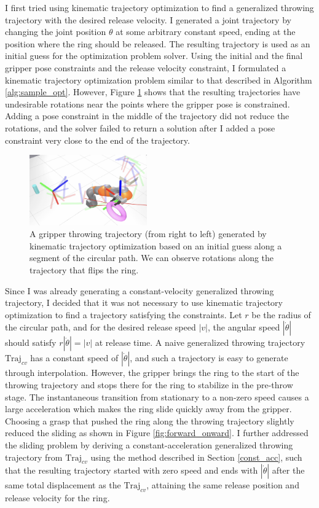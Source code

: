\documentclass[conference]{IEEEtran}
\begin{document}
I first tried using kinematic trajectory optimization to find a generalized throwing trajectory with the desired release velocity. I generated a joint trajectory by changing the joint position $\theta$ at some arbitrary constant speed, ending at the position where the ring should be released. The resulting trajectory is used as an initial guess for the optimization problem solver. Using the initial and the final gripper pose constraints and the release velocity constraint, I formulated a kinematic trajectory optimization problem similar to that described in Algorithm \ref{alg:sample_opt}. However, Figure \ref{fig:circle_rotation_traj} shows that the resulting trajectories have undesirable rotations near the points where the gripper pose is constrained. Adding a pose constraint in the middle of the trajectory did not reduce the rotations, and the solver failed to return a solution after I added a pose constraint very close to the end of the trajectory.

\begin{figure}[ht]
\centering
\includegraphics[width=0.45\textwidth]{images/circle_rotation_traj.png}
\caption{A gripper throwing trajectory (from right to left) generated by kinematic trajectory optimization based on an initial guess along a segment of the circular path. We can observe rotations along the trajectory that flips the ring.}
\label{fig:circle_rotation_traj}
\end{figure}

Since I was already generating a constant-velocity generalized throwing trajectory,  I decided that it was not necessary to use kinematic trajectory optimization to find a trajectory satisfying the constraints. Let $r$ be the radius of the circular path, and for the desired release speed $|v|$, the angular speed $| \dot{\theta} |$ should satisfy $r |\dot{\theta}| = |v|$ at release time. A naive generalized throwing trajectory $\text{Traj}_{cv}$ has a constant speed of $|\dot{\theta}|$, and such a trajectory is easy to generate through interpolation. However, the gripper brings the ring to the start of the throwing trajectory and stops there for the ring to stabilize in the pre-throw stage. The instantaneous transition from stationary to a non-zero speed causes a large acceleration which makes the ring slide quickly away from the gripper. Choosing a grasp that pushed the ring along the throwing trajectory slightly reduced the sliding as shown in Figure \ref{fig:forward_onward}. I further addressed the sliding problem by deriving a constant-acceleration generalized throwing trajectory from $\text{Traj}_{cv}$ using the method described in Section \ref{const_acc}, such that the resulting trajectory started with zero speed and ends with $|\dot{\theta}|$ after the same total displacement as the $\text{Traj}_{cv}$, attaining the same release position and release velocity for the ring.
\end{document}

